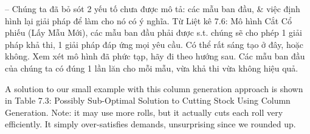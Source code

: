 \documentclass{article}
\begin{document}
\begin{itemize}
\begin{itemize}
\begin{itemize}
            -- Chúng ta đã bỏ sót 2 yếu tố chưa được mô tả: các mẫu ban đầu, \& việc định hình lại giải pháp để làm cho nó có ý nghĩa. Từ {\sf Liệt kê 7.6: Mô hình Cắt Cổ phiếu (Lấy Mẫu Mới)}, các mẫu ban đầu phải được s.t. chúng sẽ cho phép 1 giải pháp khả thi, 1 giải pháp đáp ứng mọi yêu cầu. Có thể rất sáng tạo ở đây, hoặc không. Xem xét mô hình đã phức tạp, hãy đi theo hướng sau. Các mẫu ban đầu của chúng ta có đúng 1 lần lăn cho mỗi mẫu, vừa khả thi vừa không hiệu quả.

            A solution to our small example with this column generation approach is shown in {\sf Table 7.3: Possibly Sub-Optimal Solution to Cutting Stock Using Column Generation}. Note: it may use more rolls, but it actually cuts each roll very efficiently. It simply over-satisfies demands, unsurprising since we rounded up.


\end{itemize}
\end{itemize}
\end{itemize}
\end{document}
